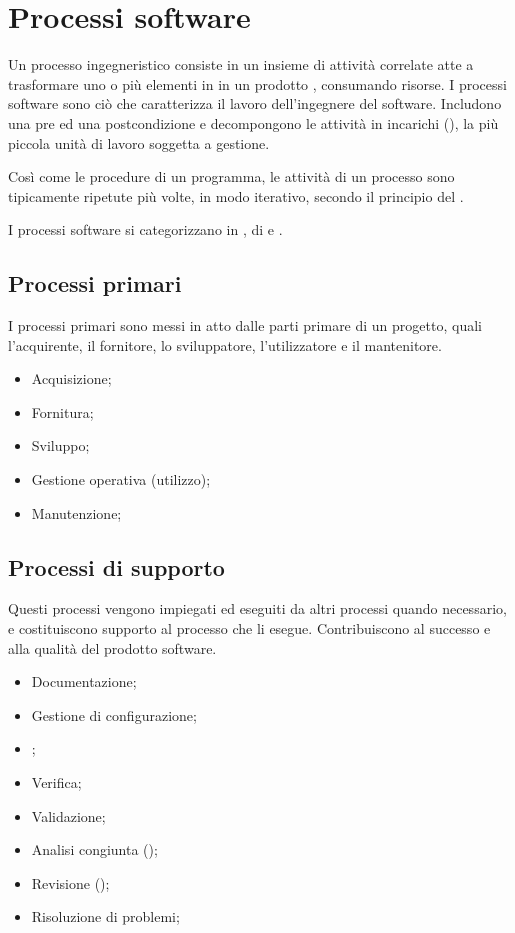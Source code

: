 \section{Processi software}

Un \gls{processo} ingegneristico consiste in un insieme di attività correlate
atte a trasformare uno o più elementi in  in un prodotto
, consumando risorse. I processi software sono ciò che
caratterizza il lavoro dell'ingegnere del software. Includono una pre ed una
postcondizione e decompongono le attività in incarichi (), la più
piccola unità di lavoro soggetta a gestione.

Così come le procedure di un programma, le attività di un processo sono
tipicamente ripetute più volte, in modo iterativo, secondo il principio del
.


I processi software si categorizzano in , di  e
.

\subsection{Processi primari}

I processi primari sono messi in atto dalle parti primare di un progetto, quali
l'acquirente, il fornitore, lo sviluppatore, l'utilizzatore e il mantenitore.

\begin{itemize}
  \item Acquisizione;
  \item Fornitura;
  \item Sviluppo;
  \item Gestione operativa (utilizzo);
  \item Manutenzione;
\end{itemize}

\subsection{Processi di supporto}

Questi processi vengono impiegati ed eseguiti da altri processi quando
necessario, e costituiscono supporto al processo che li esegue. Contribuiscono
al successo e alla qualità del prodotto software.

\begin{itemize}
  \item Documentazione;
  \item Gestione di configurazione;
  \item {};
  \item Verifica;
  \item Validazione;
  \item Analisi congiunta ();
  \item Revisione ();
  \item Risoluzione di problemi;
\end{itemize}

